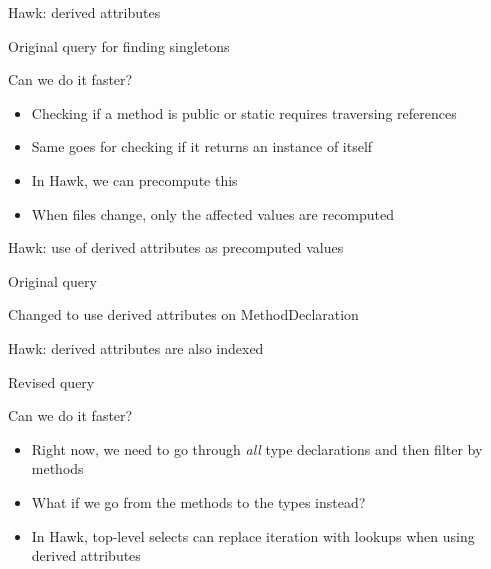 \documentclass[10pt]{beamer}
\begin{document}
\begin{frame}[fragile]{Hawk: derived attributes}
  \begin{block}{Original query for finding singletons}
    
  \end{block}

  \begin{block}{Can we do it faster?}
    \begin{itemize}
    \item Checking if a method is public or static requires traversing
      references
    \item Same goes for checking if it returns an instance of itself
    \item In Hawk, \alert{we can precompute this}
    \item When files change, only the affected values are recomputed
    \end{itemize}
  \end{block}
\end{frame}

\begin{frame}[fragile]{Hawk: use of derived attributes as precomputed values}

  \begin{block}{Original query}
    
  \end{block}

  \begin{block}{Changed to use derived attributes on MethodDeclaration}
    
  \end{block}
\end{frame}

\begin{frame}{Hawk: derived attributes are also indexed}
  \begin{block}{Revised query}
    
  \end{block}

  \begin{block}{Can we do it faster?}
    \begin{itemize}
    \item Right now, we need to go through \emph{all} type declarations and then
      filter by methods
    \item What if we go from the methods to the types instead?
    \item In Hawk, \alert{top-level selects can replace iteration with lookups
      when using derived attributes}
    \end{itemize}
  \end{block}
\end{frame}
\end{document}
